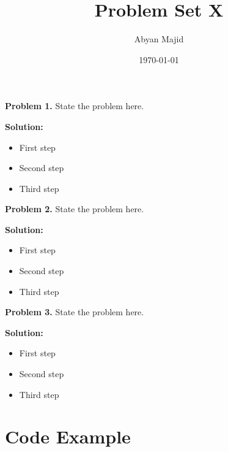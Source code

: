 \documentclass{article}
\theoremstyle{problemstyle}
\newenvironment{boxedproblem}[1]
{\begin{tcolorbox}[colback=white, colframe=black, boxrule=0.5pt]\noindent\textbf{Problem #1.}}
{\end{tcolorbox}}
\begin{document}
\title{Problem Set X}
\author{Abyan Majid}
\date{\today}
\maketitle


\begin{boxedproblem}{1}
State the problem here.
\end{boxedproblem}

\textbf{Solution:}
\begin{itemize}[label={},leftmargin=1.25cm,nosep]
    \item First step
    \item Second step
    \item Third step
\end{itemize}


\begin{boxedproblem}{2}
State the problem here.
\end{boxedproblem}

\textbf{Solution:}
\begin{itemize}[label={},leftmargin=1.25cm,nosep]
    \item First step
    \item Second step
    \item Third step
\end{itemize}


\begin{boxedproblem}{3}
State the problem here.
\end{boxedproblem}

\textbf{Solution:}
\begin{itemize}[label={},leftmargin=1.25cm,nosep]
    \item First step
    \item Second step
    \item Third step
\end{itemize}


\section{Code Example}
\end{document}
